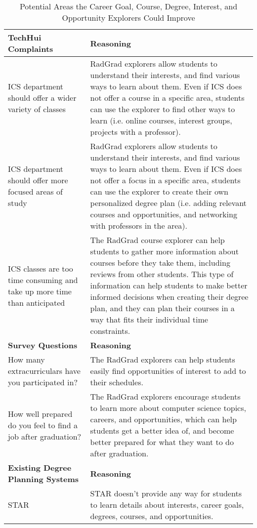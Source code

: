 \begin{table}[htbp!]
\centering
 \caption{Potential Areas the Career Goal, Course, Degree, Interest, and Opportunity Explorers Could Improve}
\begin{tabular}{  |p{4cm}|p{12cm}| } 
  \hline
 \textbf{TechHui Complaints} & \textbf{Reasoning} \\ 
  \hline
ICS department should offer a wider variety of classes & RadGrad explorers allow students to understand their interests, and find various ways to learn about them. Even if ICS does not offer a course in a specific area, students can use the explorer to find other ways to learn (i.e. online courses, interest groups, projects with a professor). \\
\hline
ICS department should offer more focused areas of study & RadGrad explorers allow students to understand their interests, and find various ways to learn about them. Even if ICS does not offer a focus in a specific area, students can use the explorer to create their own personalized degree plan (i.e. adding relevant courses and opportunities, and networking with professors in the area). \\
\hline
ICS classes are too time consuming and take up more time than anticipated & The RadGrad course explorer can help students to gather more information about courses before they take them, including reviews from other students. This type of information can help students to make better informed decisions when creating their degree plan, and they can plan their courses in a way that fits their individual time constraints.\\
\hline
 \textbf{Survey Questions} & \textbf{Reasoning} \\ 
  \hline
  How many extracurriculars have you participated in? & The RadGrad explorers can help students easily find opportunities of interest to add to their schedules.\\
  \hline
  How well prepared do you feel to find a job after graduation? & The RadGrad explorers encourage students to learn more about computer science topics, careers, and opportunities, which can help students get a better idea of, and become better prepared for what they want to do after graduation.\\
    \hline
   \textbf{Existing Degree Planning Systems} & \textbf{Reasoning} \\ 
  \hline
  STAR & STAR doesn't provide any way for students to learn details about interests, career goals, degrees, courses, and opportunities. \\

\end{tabular}
\end{table}

